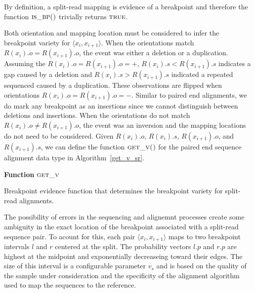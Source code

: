 \documentclass[11pt]{article}
\begin{document}
By definition, a split-read mapping is evidence of a breakpoint and therefore
the function $\textsc{is\_bp()}$ trivially returns $\textsc{true}$.

Both orientation and mapping location must be considered to infer the breakpoint
variety for $\langle x_i,x_{i+1} \rangle$.  When the orientations match
$R(x_{i}).o=R(x_{i+1}).o$, the event was either a deletion or
a duplication.  Assuming the $R(x_{i}).o=R(x_{i+1}).o=+$, 
$R(x_{i}).s<R(x_{i+1}).s$ indicates a gap caused by a deletion and 
$R(x_{i}).s>R(x_{i+1}).s$ indicated a repeated sequenced caused by a
duplication.   These observations are flipped when orientations
$R(x_{i}).o=R(x_{i+1}).o=-$.  Similar to paired end alignments, we do mark any
breakpoint as an insertions since we cannot distinguish between deletions and
insertions.  When the orientations do not match $R(x_{i}).o \ne R(x_{i+1}).o$,
the event was an inversion and the mapping locations do not need to be
considered.  Given $R(x_i).o$, $R(x_i).s$, $R(x_{i+1}).o$, and $R(x_{i+1}).s$,
we can define the function $\textsc{get\_v()}$ for the paired end sequence
alignment data type in Algorithm~\ref{get_v_sr}.

\begin{algorithm}[H]
    \DontPrintSemicolon
    \footnotesize
    \BlankLine
    \textbf{Function} $\textsc{get\_v}$\;
	\caption{Breakpoint evidence function that determines the breakpoint variety
			 for split-read alignments.}
    \label{get_v_sr}
\end{algorithm}

The possibility of errors in the sequencing and alignemnt processes create some
ambiguity in the exact location of the breakpoint associated with a split-read
sequence pair.  To acount for this, each pair $\langle x_i, x_{i+1} \rangle$
maps to two breakpoint intervals $l$ and $r$ centered at the split. The 
probability vectors $l.p$ and $r.p$ are highest at the midpoint and
exponentially decreaseing toward their edges.  The size of this interval is a
configurable parameter $v_s$ and is based on the quality of the sample under
consideration and the specificity of the alignment algorithm used to map the
sequences to the reference.
\end{document}
